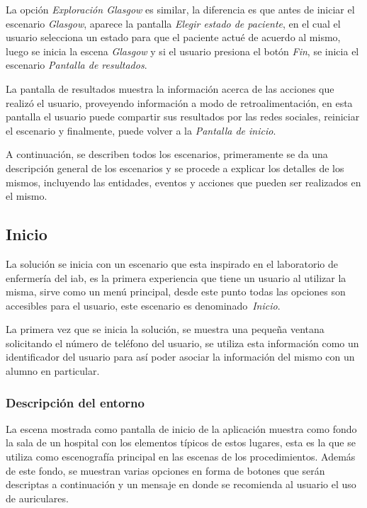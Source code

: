 La opción \emph{Exploración Glasgow} es similar, la diferencia es que antes de
iniciar el escenario \emph{Glasgow}, aparece la pantalla \emph{Elegir estado de
    paciente}, en el cual el usuario selecciona un estado para que el paciente
actué de acuerdo al mismo, luego se inicia la escena \emph{Glasgow} y si el
usuario presiona el botón \emph{Fin}, se inicia el escenario \emph{Pantalla de
    resultados}.

La pantalla de resultados muestra la información acerca de las acciones que
realizó el usuario, proveyendo información a modo de retroalimentación, en esta
pantalla el usuario puede compartir sus resultados por las redes sociales,
reiniciar el escenario y finalmente, puede volver a la \emph{Pantalla de
    inicio}.

A continuación, se describen todos los escenarios, primeramente se da una 
descripción general de los escenarios y se procede a explicar los detalles 
de los mismos, incluyendo las entidades, eventos y acciones que pueden ser realizados 
en el mismo.

\subsection{Inicio}

La solución se inicia con un escenario que esta inspirado en el laboratorio de
enfermería del \Gls{iab}, es la primera experiencia que tiene un
usuario al utilizar la misma, sirve como un menú principal, desde
este punto todas las opciones son accesibles para el usuario, este escenario es
denominado~\emph{Inicio}.

La primera vez que se inicia la solución, se muestra una pequeña ventana
solicitando el número de teléfono del usuario, se utiliza esta información como un
identificador del usuario para así poder asociar la información del mismo con un
alumno en particular.

\subsubsection{Descripción del entorno}
\label{sec:inicio_descripcion}

La escena mostrada como pantalla de inicio de la aplicación muestra como fondo
la sala de un hospital con los elementos típicos de estos lugares, esta es la
que se utiliza como escenografía principal en las escenas de los procedimientos.
Además de este fondo, se muestran varias opciones en forma de botones que serán
descriptas a continuación y un mensaje en donde se recomienda al usuario el uso
de auriculares.

